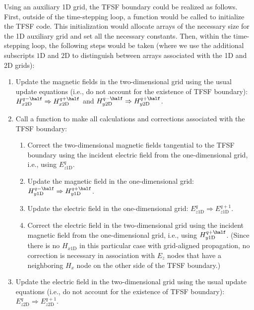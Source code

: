 Using an auxiliary 1D grid, the TFSF boundary could be realized as
follows.  First, outside of the time-stepping loop, a function would
be called to initialize the TFSF code.  This initialization would
allocate arrays of the necessary size for the 1D auxiliary grid and
set all the necessary constants.  Then, within
the time-stepping loop, the following steps would be taken (where we
use the additional subscripts $1\mathrm{D}$ and $2\mathrm{D}$ to
distinguish between arrays associated with the 1D and 2D grids):
\begin{enumerate}
\label{page:tfsfUpdateAlgorithm}
\item Update the magnetic fields in the two-dimensional grid using the
  usual update equations (i.e., do not account for the existence of
  TFSF boundary): $H_{x2\mathrm{D}}^{q-\half} \Rightarrow
  H_{x2\mathrm{D}}^{q+\half}$ and $H_{y2\mathrm{D}}^{q-\half}
  \Rightarrow H_{y2\mathrm{D}}^{q+\half}$.
\item Call a function to make all calculations and corrections
  associated with the TFSF boundary:
\begin{enumerate}
\item Correct the two-dimensional magnetic fields tangential to the
  TFSF boundary using the incident electric field from the
  one-dimensional grid, i.e., using $E_{z1\mathrm{D}}^{q}$.
\item Update the magnetic field in the one-dimensional grid:
  $H_{y1\mathrm{D}}^{q-\half} \Rightarrow H_{y1\mathrm{D}}^{q+\half}$.
\item Update the electric field in the one-dimensional grid:
  $E_{z1\mathrm{D}}^{q} \Rightarrow E_{z1\mathrm{D}}^{q+1}$.
\item Correct the electric field in the two-dimensional grid using the
  incident magnetic field from the one-dimensional grid, i.e., using
  $H_{y1\mathrm{D}}^{q+\half}$.  (Since there is no $H_{x1\mathrm{D}}$
  in this particular case with grid-aligned propagation, no correction
  is necessary in association with $E_z$ nodes that have a neighboring
  $H_x$ node on the other side of the TFSF boundary.)
\end{enumerate}
\item Update the electric field in the two-dimensional grid using the
  usual update equations (i.e., do not account for the existence of
  TFSF boundary):  $E_{z2\mathrm{D}}^{q} \Rightarrow
  E_{z2\mathrm{D}}^{q+1}$.
\end{enumerate}

